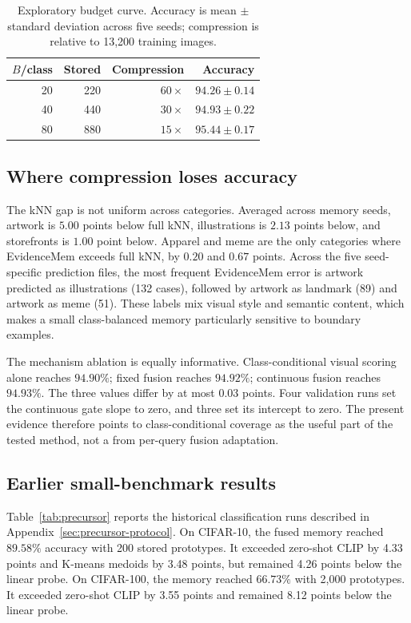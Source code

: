 \documentclass[10pt,twocolumn]{article}
\newcommand{\method}{EvidenceMem}
\begin{document}
\begin{table}[t]
\centering
\small
\caption{Exploratory budget curve. Accuracy is mean $\pm$ standard deviation across
five seeds; compression is relative to 13,200 training images.}
\label{tab:budget}
\begin{tabular}{rrrr}
\toprule
$B$/class & Stored & Compression & Accuracy \\
\midrule
20 & 220 & $60\times$ & $94.26\pm0.14$ \\
40 & 440 & $30\times$ & $94.93\pm0.22$ \\
80 & 880 & $15\times$ & $95.44\pm0.17$ \\
\bottomrule
\end{tabular}
\end{table}

\subsection{Where compression loses accuracy}

The kNN gap is not uniform across categories. Averaged across memory seeds, artwork is
$5.00$ points below full kNN, illustrations is $2.13$ points below, and storefronts is
$1.00$ point below. Apparel and meme are the only categories where \method{} exceeds
full kNN, by $0.20$ and $0.67$ points. Across the five seed-specific prediction files,
the most frequent \method{} error is artwork predicted as illustrations (132 cases),
followed by artwork as landmark (89) and artwork as meme (51). These labels mix visual
style and semantic content, which makes a small class-balanced memory particularly
sensitive to boundary examples.

The mechanism ablation is equally informative. Class-conditional visual scoring alone
reaches $94.90\%$; fixed fusion reaches $94.92\%$; continuous fusion reaches $94.93\%$.
The three values differ by at most $0.03$ points. Four validation runs set the continuous
gate slope to zero, and three set its intercept to zero. The present evidence therefore
points to class-conditional coverage as the useful part of the tested method, not a
from per-query fusion adaptation.

\subsection{Earlier small-benchmark results}

Table~\ref{tab:precursor} reports the historical classification runs described in
Appendix~\ref{sec:precursor-protocol}. On CIFAR-10, the fused memory reached
$89.58\%$ accuracy with 200 stored prototypes. It exceeded zero-shot CLIP by 4.33
points and K-means medoids by 3.48 points, but remained 4.26 points below the linear
probe. On CIFAR-100, the memory reached $66.73\%$ with 2,000 prototypes. It exceeded
zero-shot CLIP by 3.55 points and remained 8.12 points below the linear probe.
\end{document}

